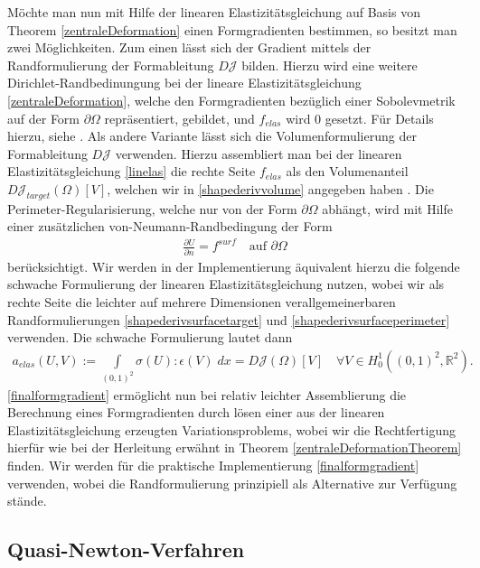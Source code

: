 Möchte man nun mit Hilfe der linearen Elastizitätsgleichung auf Basis von Theorem \ref{zentraleDeformation} einen Formgradienten bestimmen, so besitzt man zwei Möglichkeiten. Zum einen lässt sich der Gradient mittels der Randformulierung der Formableitung $D\mathcal{J}$ bilden. Hierzu wird eine weitere Dirichlet-Randbedinungung bei der lineare Elastizitätsgleichung \ref{zentraleDeformation}, welche den Formgradienten bezüglich einer Sobolevmetrik auf der Form $\partial\Omega$ repräsentiert, gebildet, und $f_{elas}$ wird $0$ gesetzt. Für Details hierzu, siehe \cite{bfgs2}.
Als andere Variante lässt sich die Volumenformulierung der Formableitung $D\mathcal{J}$ verwenden. Hierzu assembliert man bei der linearen Elastizitätsgleichung \ref{linelas} die rechte Seite $f_{elas}$ als den Volumenanteil $D\mathcal{J}_{target}(\Omega)[V]$, welchen wir in \ref{shapederivvolume} angegeben haben . Die Perimeter-Regularisierung, welche nur von der Form $\partial\Omega$ abhängt, wird mit Hilfe einer zusätzlichen von-Neumann-Randbedingung der Form
\begin{align*}
	\frac{\partial U}{\partial n} = f^{surf} \quad \text{auf } \partial\Omega
\end{align*}
berücksichtigt. Wir werden in der Implementierung äquivalent hierzu die folgende schwache Formulierung der linearen Elastizitätsgleichung nutzen, wobei wir als rechte Seite die leichter auf mehrere Dimensionen verallgemeinerbaren Randformulierungen \ref{shapederivsurfacetarget} und \ref{shapederivsurfaceperimeter} verwenden. Die schwache Formulierung lautet dann
\begin{equation}\label{finalformgradient}
	\begin{aligned}
		a_{elas}(U,V) := \underset{(0,1)^2}{\int}\sigma(U):\epsilon(V) \;dx = D\mathcal{J}(\Omega)[V] \quad \forall V\in H^1_0((0,1)^2, \mathbb{R}^2).
	\end{aligned}
\end{equation}
\ref{finalformgradient} ermöglicht nun bei relativ leichter Assemblierung die Berechnung eines Formgradienten durch lösen einer aus der linearen Elastizitätsgleichung erzeugten Variationsproblems, wobei wir die Rechtfertigung hierfür wie bei der Herleitung erwähnt in Theorem \ref{zentraleDeformationTheorem} finden. Wir werden für die praktische Implementierung \ref{finalformgradient} verwenden, wobei die Randformulierung prinzipiell als Alternative zur Verfügung stände. 

\subsection{Quasi-Newton-Verfahren}

